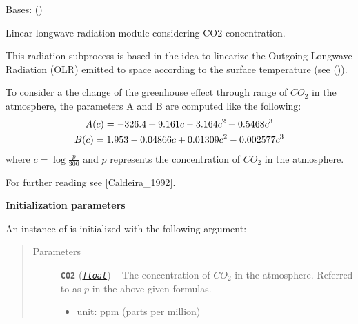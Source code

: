 \documentclass[a4paper,10pt,english]{sphinxmanual}
\begin{document}
\begin{fulllineitems}
\label{api/climlab.radiation:climlab.radiation.AplusBT.AplusBT_CO2}
Bases: {\hyperref[api/climlab.process:climlab.process.energy_budget.EnergyBudget]{\emph{}}} ()

Linear longwave radiation module considering CO2 concentration.

This radiation subprocess is based in the idea to linearize the Outgoing 
Longwave Radiation (OLR) emitted to space according to the surface temperature
(see {\hyperref[api/climlab.radiation:climlab.radiation.AplusBT.AplusBT]{\emph{}}} ()).

To consider a the change of the greenhouse effect through range of
\(CO_2\) in the atmosphere, the parameters A and B are computed like
the following:
\begin{gather}
\begin{split}A(c) = -326.4 + 9.161 c - 3.164 c^2 + 0.5468 c^3            \end{split}\notag\\\begin{split}B(c) =  1.953 - 0.04866 c + 0.01309 c^2 - 0.002577 c^3\end{split}\notag
\end{gather}
where \(c=\log \frac{p}{300}\) and \(p\) represents 
the concentration of \(CO_2\) in the atmosphere.

For further reading see {[}Caldeira\_1992{]}.

\textbf{Initialization parameters}

An instance of  is initialized with the following 
argument:
\begin{quote}\begin{description}
\item[{Parameters}] \leavevmode
\textbf{\texttt{CO2}} (\href{http://docs.python.org/2.7/library/functions.html\#float}{\emph{\texttt{float}}}) -- 
The concentration of \(CO_2\) in the atmosphere.
Referred to as \(p\) in the above given formulas.
\begin{itemize}
\item {} 
unit: \(\textrm{ppm}\) (parts per million)


\end{itemize}
\end{description}
\end{quote}
\end{fulllineitems}
\end{document}
